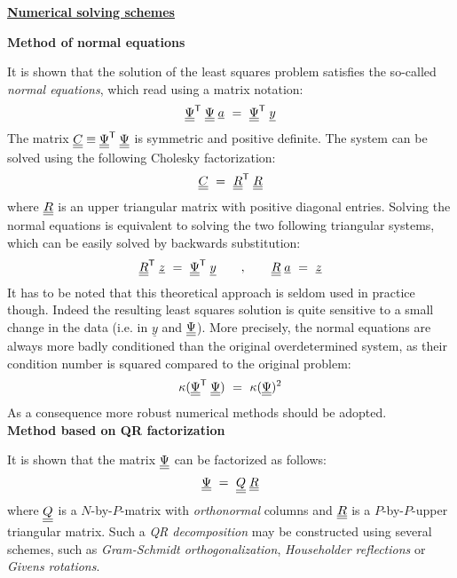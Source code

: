 {\underline{\textbf{Numerical solving schemes}} \vspace{3mm}

\textbf{Method of normal equations} \vspace{2mm}

It is shown that the solution of the least squares problem satisfies the so-called \emph{normal equations}, which read using a matrix notation:
$$
\underline{\underline{\Psi}}^{\mbox{\scriptsize \textsf{T}}} \; \underline{\underline{\Psi}} \; \underline{a} \, \, = \, \, \underline{\underline{\Psi}}^{\mbox{\scriptsize \textsf{T}}} \; \underline{y} 
$$ 
The matrix $\underline{\underline{C}} \equiv \underline{\underline{\Psi}}^{\mbox{\scriptsize \textsf{T}}} \; \underline{\underline{\Psi}}$ is symmetric and positive definite. The system can be solved using the following Cholesky factorization:
$$
\underline{\underline{C}} \, \, = \, \, \underline{\underline{R}}^{\mbox{\scriptsize \textsf{T}}} \; \underline{\underline{R}}
$$
where $\underline{\underline{R}}$ is an upper triangular matrix with positive diagonal entries. Solving the normal equations is equivalent to solving the two following triangular systems, which can be easily solved by backwards substitution:
$$
\underline{\underline{R}}^{\mbox{\scriptsize \textsf{T}}} \; \underline{z} \, \, = \, \, \underline{\underline{\Psi}}^{\mbox{\scriptsize \textsf{T}}} \; \underline{y} 
\qquad , \qquad \underline{\underline{R}} \; \underline{a} \, \, = \, \, \underline{z} 
$$
It has to be noted that this theoretical approach is seldom used in practice though. Indeed the resulting least squares solution is quite sensitive to a small change in the data (i.e. in $\underline{y}$ and $\underline{\underline{\Psi}}$). More precisely, the normal equations are always more badly conditioned than the original overdetermined system, as their condition number is squared compared to the original problem:
$$
\kappa(\underline{\underline{\Psi}}^{\mbox{\scriptsize \textsf{T}}} \; \underline{\underline{\Psi}}) \, \, = \, \, \kappa(\underline{\underline{\Psi}})^2
$$ 
As a consequence more robust numerical methods should be adopted. \\

\textbf{Method based on QR factorization} \vspace{2mm}

It is shown that the matrix $\underline{\underline{\Psi}}$ can be factorized as follows:
$$
\underline{\underline{\Psi}} \, \, = \, \, \underline{\underline{Q}} \; \underline{\underline{R}}
$$
where $\underline{\underline{Q}}$ is a $N$-by-$P$-matrix with \emph{orthonormal} columns and $\underline{\underline{R}}$ is a $P$-by-$P$-upper triangular matrix. Such a \emph{QR decomposition} may be constructed using several schemes, such as \emph{Gram-Schmidt orthogonalization}, \emph{Householder reflections} or \emph{Givens rotations}. \\

}
